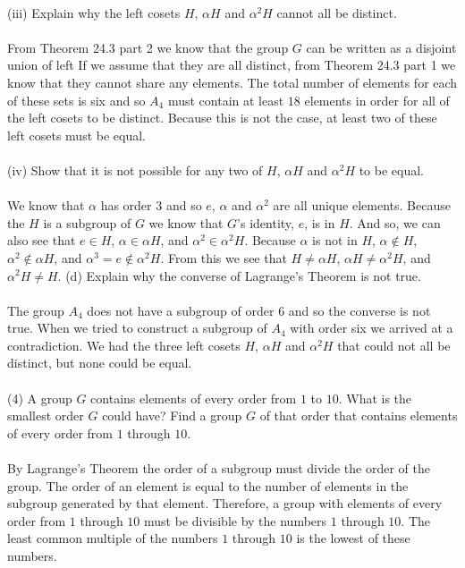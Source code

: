 \documentclass[11pt,a4paper]{article}
\begin{document}
~\\
(iii) Explain why the left cosets $H$, $\alpha H$ and $\alpha^2 H$ cannot all be distinct.\\
~\\
From Theorem 24.3 part 2 we know that the group $G$ can be written as a disjoint union of left
If we assume that they are all distinct, from Theorem 24.3 part 1 we know that they cannot share any elements. The total number of elements for each of these sets is six and so $A_4$ must contain at least $18$ elements in order for all of the left cosets to be distinct. Because this is not the case, at least two of these left cosets must be equal.\\
~\\
(iv) Show that it is not possible for any two of $H$, $\alpha H$ and $\alpha^2 H$ to be equal.\\
~\\
We know that $\alpha$ has order $3$ and so $e$, $\alpha$ and $\alpha^2$ are all unique elements. Because the $H$ is a subgroup of $G$ we know that $G$'s identity, $e$, is in $H$. And so, we can also see that $e\in H$, $\alpha \in \alpha H$, and $\alpha^2 \in \alpha^2 H$. Because $\alpha$ is not in $H$, $\alpha \notin H $, $\alpha^2 \notin \alpha H$, and $\alpha^3 = e \notin \alpha^2 H$. From this we see that $H \neq \alpha H$, $\alpha H \neq \alpha^2 H$, and $\alpha^2 H \neq H$.
(d) Explain why the converse of Lagrange's Theorem is not true.\\
~\\
The group $A_4$ does not have a subgroup of order $6$ and so the converse is not true. When we tried to construct a subgroup of $A_4$ with order six we arrived at a contradiction. We had the three left cosets $H$, $\alpha H$ and $\alpha^2 H$ that could not all be distinct, but none could be equal.\\
~\\
(4) A group $G$ contains elements of every order from $1$ to $10$. What is the smallest order $G$ could have? Find a group $G$ of that order that contains elements of every order from $1$ through $10$.\\
~\\
By Lagrange's Theorem the order of a subgroup must divide the order of the group. The order of an element is equal to the number of elements in the subgroup generated by that element. Therefore, a group with elements of every order from $1$ through $10$ must be divisible by the numbers $1$ through $10$. The least common multiple of the numbers $1$ through $10$ is the lowest of these numbers.
\end{document}
